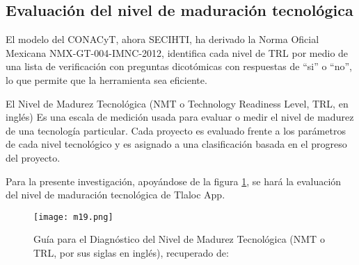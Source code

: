 \subsection{Evaluación del nivel de maduración tecnológica}

El modelo del CONACyT, ahora SECIHTI, ha derivado la Norma Oficial Mexicana NMX-GT-004-IMNC-2012, identifica cada nivel de TRL por medio de una lista de verificación con preguntas dicotómicas con respuestas de ``si'' o ``no'', lo que permite que la herramienta sea eficiente.


El Nivel de Madurez Tecnológica (NMT o Technology Readiness Level, TRL, en inglés) 
Es una escala de medición usada para evaluar o medir el nivel de madurez de una
tecnología particular. Cada proyecto es evaluado frente a los parámetros de cada
nivel tecnológico y es asignado a una clasificación basada en el progreso del
proyecto.

Para la presente investigación, apoyándose de la figura \ref{m19}, se hará la evaluación del nivel de maduración tecnológica de Tlaloc App.

\begin{figure}[h!]
\centering
  \texttt{[image: m19.png]}
  \caption{Guía para el Diagnóstico del Nivel de Madurez Tecnológica (NMT o TRL, por sus siglas en inglés), recuperado de: \cite{SECIHTIConvocatorias}}
  \label{m19}
\end{figure}
